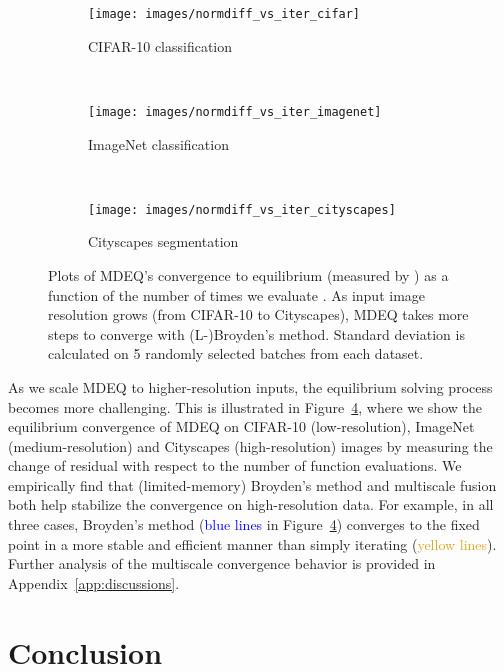 \documentclass{article}
\begin{document}
\begin{figure}[t]
\centering
\begin{subfigure}[b]{0.32\textwidth}
\texttt{[image: images/normdiff\_vs\_iter\_cifar]}
\vspace{-.2in}
\caption{CIFAR-10 classification}
\label{subfig:cifar-10-convergence}
\end{subfigure}
~
\begin{subfigure}[b]{0.32\textwidth}
\texttt{[image: images/normdiff\_vs\_iter\_imagenet]}
\vspace{-.2in}
\caption{ImageNet classification}
\label{subfig:imagenet-convergence}
\end{subfigure}
~
\begin{subfigure}[b]{0.32\textwidth}
\texttt{[image: images/normdiff\_vs\_iter\_cityscapes]}
\vspace{-.2in}
\caption{Cityscapes segmentation}
\label{subfig:cityscapes-convergence}
\end{subfigure}
\vspace{-.16in}
\caption{Plots of MDEQ's convergence to equilibrium (measured by \small\normalsize) as a function of the number of times we evaluate . As input image resolution grows (from CIFAR-10 to Cityscapes), MDEQ takes more steps to converge with (L-)Broyden's method. Standard deviation is calculated on 5 randomly selected batches from each dataset.}
\label{fig:convergence}
\vspace{-.15in}
\end{figure}

As we scale MDEQ to higher-resolution inputs, the equilibrium solving process becomes more challenging. This is illustrated in Figure~\ref{fig:convergence}, where we show the equilibrium convergence of MDEQ on CIFAR-10 (low-resolution), ImageNet (medium-resolution) and Cityscapes (high-resolution) images by measuring the change of residual with respect to the number of function evaluations. We empirically find that (limited-memory) Broyden's method and multiscale fusion both help stabilize the convergence on high-resolution data. For example, in all three cases, Broyden's method (\textcolor{blue}{blue lines} in Figure~\ref{fig:convergence}) converges to the fixed point in a more stable and efficient manner than simply iterating  (\textcolor{Goldenrod}{yellow lines}). Further analysis of the multiscale convergence behavior is provided in Appendix~\ref{app:discussions}.


\section{Conclusion}
\end{document}

